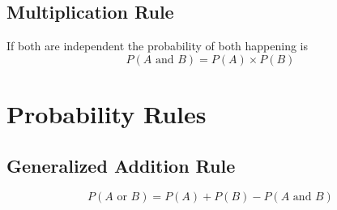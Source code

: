\documentclass[11pt]{article}
\begin{document}
\pagestyle{empty}
\def\rectangle{(0,0)--(0,4)--(4,4)--(4,0)--cycle}
\def\uncircle{(1,1) circle (1cm)}
\def\deuxcircle{(3,3) circle (1cm)}

\subsection*{Multiplication Rule}
If both are independent the probability of both happening is 
\begin{equation}
    P(A \text{ and } B)=P(A) \times P(B)
\end{equation}

\pagestyle{empty}
\def\rectangleun{(0,0)--(0,4)--(4,4)--(4,0)--cycle}
\def\circleun{(1,2) circle (1cm)}
\def\circledeux{(2,3) circle (1cm)}

\newpage
 \section*{Probability Rules}
 \subsection*{Generalized Addition Rule}
 \begin{equation}
 P(A \text{ or } B) = P(A) + P(B) - P(A \text{ and } B)
 \end{equation}

\pagestyle{empty}
\def\rectangleunun{(0,0)--(0,4)--(4,4)--(4,0)--cycle}
\def\circleunun{(1,2) circle (1cm)}
\def\circledeuxdeux{(2,3) circle (1cm)}
\end{document}
